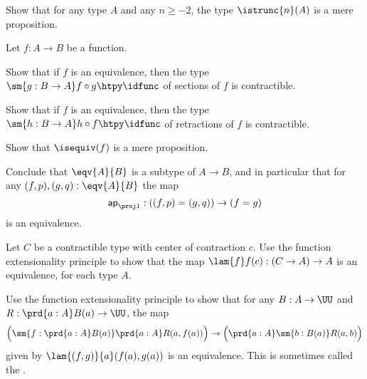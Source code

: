 \begin{exercises}
\item Show that for any type $A$ and any $n\geq-2$, the type $\istrunc{n}(A)$ is a mere proposition.
\item Let $f:A\to B$ be a function.
\begin{subexenum}
\item Show that if $f$ is an equivalence, then the type $\sm{g:B\to A}f\circ g\htpy \idfunc$ of sections of $f$ is contractible.
\item Show that if $f$ is an equivalence, then the type $\sm{h:B\to A}h\circ f\htpy \idfunc$ of retractions of $f$ is contractible.
\item Show that $\isequiv(f)$ is a mere proposition.
\item Conclude that $\eqv{A}{B}$ is a subtype of $A\to B$, and in particular that for any $(f,p),(g,q):\eqv{A}{B}$ the map
\begin{equation*}
\mathsf{ap}_{\proj 1} : ((f,p)= (g,q))\to (f=g)
\end{equation*}
is an equivalence.
\end{subexenum}
\item Let $C$ be a contractible type with center of contraction $c$. Use the function extensionality principle to show that the map $\lam{f}f(c):(C\to A)\to A$ is an equivalence, for each type $A$.
\item Use the function extensionality principle to show that for any $B:A\to\UU$ and $R:\prd{a:A}B(a)\to \UU$, the map
\begin{equation*}
\Big(\sm{f:\prd{a:A}B(a)}\prd{a:A}R(a,f(a))\Big)\to \Big(\prd{a:A}\sm{b:B(a)}R(a,b)\Big)
\end{equation*}
given by $\lam{(f,g)}{a}(f(a),g(a))$ is an equivalence. This is sometimes called the .


\end{exercises}
